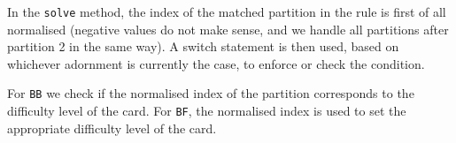 In the \texttt{solve} method, the index of the matched partition in the rule is first of all normalised (negative values do not make sense, and we handle all partitions  after partition 2 in the same way).
A switch statement is then used, based on whichever adornment is currently the case, to enforce or check the condition. 

For \texttt{BB} we check if the normalised index of the partition corresponds to the difficulty level of the card.
For \texttt{BF}, the normalised index is used to set the appropriate difficulty level of the card.

